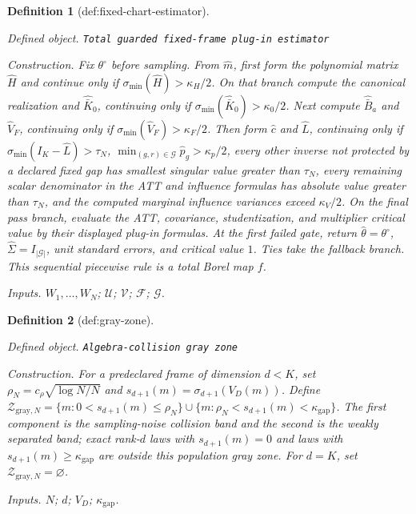 \documentclass{article}
\newtheorem{definition}{Definition}
\begin{document}
\begin{definition}[def:fixed-chart-estimator]\label{def:fixed-chart-estimator}
\par\smallskip\noindent\emph{Defined object.} \texttt{Total guarded fixed-\allowbreak{}frame plug-\allowbreak{}in estimator}
\par\smallskip\noindent\emph{Construction.} Fix \(\theta^{\circ}\) before sampling. From \(\widehat m\), first form the polynomial matrix \(\widehat H\) and continue only if \(\sigma_{\min}(\widehat H)>\kappa_H/2\). On that branch compute the canonical realization and \(\widehat{\bar K}_0\), continuing only if \(\sigma_{\min}(\widehat{\bar K}_0)>\kappa_0/2\). Next compute \(\widehat{\bar B}_a\) and \(\widehat V_F\), continuing only if \(\sigma_{\min}(\widehat V_F)>\kappa_F/2\). Then form \(\widehat c\) and \(\widehat L\), continuing only if \(\sigma_{\min}(I_K-\widehat L)>\tau_N\), \(\min_{(g,r)\in\mathcal G}\widehat p_g>\kappa_p/2\), every other inverse not protected by a declared fixed gap has smallest singular value greater than \(\tau_N\), every remaining scalar denominator in the ATT and influence formulas has absolute value greater than \(\tau_N\), and the computed marginal influence variances exceed \(\kappa_V/2\). On the final pass branch, evaluate the ATT, covariance, studentization, and multiplier critical value by their displayed plug-in formulas. At the first failed gate, return \(\widehat\theta=\theta^{\circ}\), \(\widehat\Sigma=I_{|\mathcal G|}\), unit standard errors, and critical value \(1\). Ties take the fallback branch. This sequential piecewise rule is a total Borel map \(f\).
\par\smallskip\noindent\emph{Inputs.} \(W_1,\ldots,W_N\); \(\mathcal U\); \(\mathcal V\); \(\mathcal F\); \(\mathcal G\).
\end{definition}

\begin{definition}[def:gray-zone]\label{def:gray-zone}
\par\smallskip\noindent\emph{Defined object.} \texttt{Algebra-\allowbreak{}collision gray zone}
\par\smallskip\noindent\emph{Construction.} For a predeclared frame of dimension \(d<K\), set \(\rho_N=c_{\rho}\sqrt{\log N/N}\) and \(s_{d+1}(m)=\sigma_{d+1}(V_D(m))\). Define \(\mathcal Z_{\mathrm{gray},N}=\{m:0<s_{d+1}(m)\le\rho_N\}\cup\{m:\rho_N<s_{d+1}(m)<\kappa_{\mathrm{gap}}\}\). The first component is the sampling-noise collision band and the second is the weakly separated band; exact rank-\(d\) laws with \(s_{d+1}(m)=0\) and laws with \(s_{d+1}(m)\ge\kappa_{\mathrm{gap}}\) are outside this population gray zone. For \(d=K\), set \(\mathcal Z_{\mathrm{gray},N}=\varnothing\).
\par\smallskip\noindent\emph{Inputs.} \(N\); \(d\); \(V_D\); \(\kappa_{\mathrm{gap}}\).
\end{definition}
\end{document}
